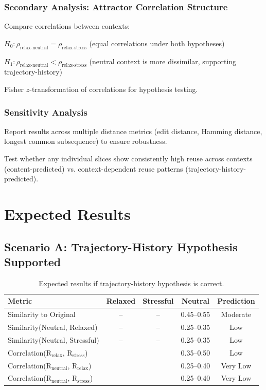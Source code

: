 \documentclass[12pt,a4paper]{article}
\theoremstyle{definition}
\begin{document}
\subsubsection{Secondary Analysis: Attractor Correlation Structure}

Compare correlations between contexts:

$H_0: \rho_{\text{relax-neutral}} = \rho_{\text{relax-stress}}$ (equal correlations under both hypotheses)

$H_1: \rho_{\text{relax-neutral}} < \rho_{\text{relax-stress}}$ (neutral context is more dissimilar, supporting trajectory-history)

Fisher $z$-transformation of correlations for hypothesis testing.

\subsubsection{Sensitivity Analysis}

Report results across multiple distance metrics (edit distance, Hamming distance, longest common subsequence) to ensure robustness.

Test whether any individual slices show consistently high reuse across contexts (content-predicted) vs. context-dependent reuse patterns (trajectory-history-predicted).

\section{Expected Results}

\subsection{Scenario A: Trajectory-History Hypothesis Supported}

\begin{table}[H]
\centering
\begin{tabular}{lcccc}
\toprule
Metric & Relaxed & Stressful & Neutral & Prediction \\
\midrule
Similarity to Original & -- & -- & 0.45--0.55 & Moderate \\
Similarity(Neutral, Relaxed) & -- & -- & 0.25--0.35 & Low \\
Similarity(Neutral, Stressful) & -- & -- & 0.25--0.35 & Low \\
Correlation(R$_{\text{relax}}$, R$_{\text{stress}}$) & & & 0.35--0.50 & Low \\
Correlation(R$_{\text{neutral}}$, R$_{\text{relax}}$) & & & 0.25--0.40 & Very Low \\
Correlation(R$_{\text{neutral}}$, R$_{\text{stress}}$) & & & 0.25--0.40 & Very Low \\
\bottomrule
\end{tabular}
\caption{Expected results if trajectory-history hypothesis is correct.}
\end{table}
\end{document}
